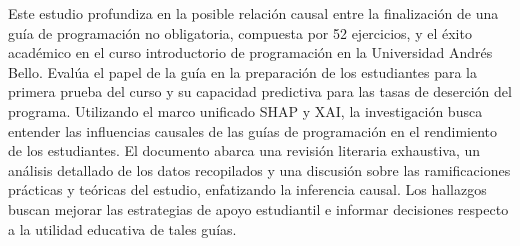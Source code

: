\fontsize{12}{14}\selectfont
Este estudio profundiza en la posible relación causal entre la finalización de una guía de programación no obligatoria, compuesta por 52 ejercicios, y el éxito académico en el curso introductorio de programación en la Universidad Andrés Bello. Evalúa el papel de la guía en la preparación de los estudiantes para la primera prueba del curso y su capacidad predictiva para las tasas de deserción del programa. Utilizando el marco unificado SHAP y XAI, la investigación busca entender las influencias causales de las guías de programación en el rendimiento de los estudiantes. El documento abarca una revisión literaria exhaustiva, un análisis detallado de los datos recopilados y una discusión sobre las ramificaciones prácticas y teóricas del estudio, enfatizando la inferencia causal. Los hallazgos buscan mejorar las estrategias de apoyo estudiantil e informar decisiones respecto a la utilidad educativa de tales guías.
